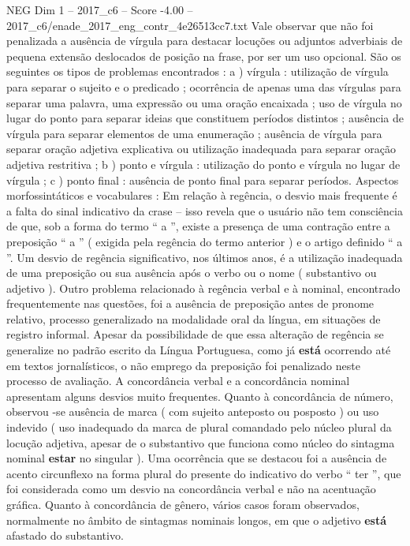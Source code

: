 \begin{textsample}{NEG Dim 1 – 2017\_c6 – Score -4.00 – 2017\_c6/enade\_2017\_eng\_contr\_4e26513cc7.txt}
Vale observar que não foi penalizada a ausência de vírgula para destacar locuções ou adjuntos adverbiais de pequena extensão deslocados de posição na frase, por ser um uso opcional.
São os seguintes os tipos de problemas encontrados : a ) vírgula : utilização de vírgula para separar o sujeito e o predicado ; ocorrência de apenas uma das vírgulas para separar uma palavra, uma expressão ou uma oração encaixada ; uso de vírgula no lugar do ponto para separar ideias que constituem períodos distintos ; ausência de vírgula para separar elementos de uma enumeração ; ausência de vírgula para separar oração adjetiva explicativa ou utilização inadequada para separar oração adjetiva restritiva ; b ) ponto e vírgula : utilização do ponto e vírgula no lugar de vírgula ; c ) ponto final : ausência de ponto final para separar períodos.
Aspectos morfossintáticos e vocabulares : Em relação à regência, o desvio mais frequente é a falta do sinal indicativo da crase – isso revela que o usuário não tem consciência de que, sob a forma do termo “ a ”, existe a presença de uma contração entre a preposição “ a ” ( exigida pela regência do termo anterior ) e o artigo definido “ a ”.
Um desvio de regência significativo, nos últimos anos, é a utilização inadequada de uma preposição ou sua ausência após o verbo ou o nome ( substantivo ou adjetivo ).
Outro problema relacionado à regência verbal e à nominal, encontrado frequentemente nas questões, foi a ausência de preposição antes de pronome relativo, processo generalizado na modalidade oral da língua, em situações de registro informal.
Apesar da possibilidade de que essa alteração de regência se generalize no padrão escrito da Língua Portuguesa, como já \textbf{está} ocorrendo até em textos jornalísticos, o não emprego da preposição foi penalizado neste processo de avaliação.
A concordância verbal e a concordância nominal apresentam alguns desvios muito frequentes.
Quanto à concordância de número, observou -se ausência de marca ( com sujeito anteposto ou posposto ) ou uso indevido ( uso inadequado da marca de plural comandado pelo núcleo plural da locução adjetiva, apesar de o substantivo que funciona como núcleo do sintagma nominal \textbf{estar} no singular ).
Uma ocorrência que se destacou foi a ausência de acento circunflexo na forma plural do presente do indicativo do verbo “ ter ”, que foi considerada como um desvio na concordância verbal e não na acentuação gráfica.
Quanto à concordância de gênero, vários casos foram observados, normalmente no âmbito de sintagmas nominais longos, em que o adjetivo \textbf{está} afastado do substantivo.

\end{textsample}
